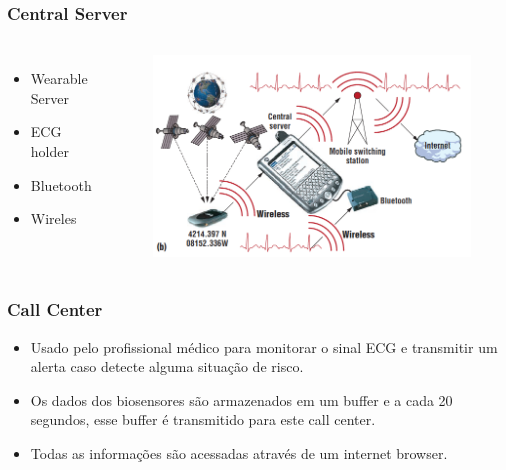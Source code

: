 \documentclass{beamer}
\begin{document}

\begin{frame}
\frametitle{Central Server}

\begin{columns}[c] %

	\begin{itemize}
		\item Wearable Server
		\item ECG holder
		\item Bluetooth
		\item Wireles
	\end{itemize}

	\begin{figure}
		\includegraphics[width=1\linewidth]{figura2-central-server.png}
	\end{figure}

\end{columns}

\end{frame}


\begin{frame}
\frametitle{Call Center}

	\begin{itemize}
		\item Usado pelo profissional médico para monitorar o sinal ECG e transmitir um alerta caso detecte alguma situação de risco. 
		\item Os dados dos biosensores são armazenados em um buffer e a cada 20 segundos, esse buffer é transmitido para este call center. 
		\item Todas as informações são acessadas através de um internet browser.
	\end{itemize}
\end{frame}
\end{document}
